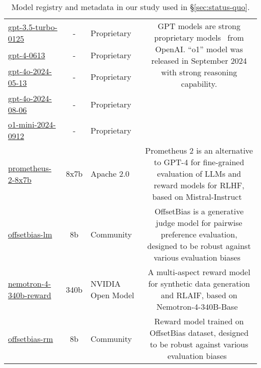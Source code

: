 \begin{table*}[ht!]
\begin{tabular}{@{}lclc@{}}
        \midrule
    \href{https://platform.openai.com/docs/models}{gpt-3.5-turbo-0125}       & -             & Proprietary & \multirow{3}{7cm}{GPT models are strong proprietary models~\citep{achiam2023gpt} from OpenAI. ``o1'' model was released in September 2024 with strong reasoning capability. }                       \\
             \href{https://platform.openai.com/docs/models}{gpt-4-0613}                   & -             & Proprietary & \\

    \href{https://platform.openai.com/docs/models}{gpt-4o-2024-05-13}                   & -             & Proprietary & \\
     \href{https://platform.openai.com/docs/models}{gpt-4o-2024-08-06}                   & -             & Proprietary & \\
  \href{https://platform.openai.com/docs/models}{o1-mini-2024-0912}                   & -             & Proprietary & \\
 \midrule
    \href{https://huggingface.co/prometheus-eval/prometheus-8x7b-v2.0}{prometheus-2-8x7b}       & 8x7b  & Apache 2.0 & \parbox{7cm}{Prometheus 2 is an alternative to GPT-4 for fine-grained evaluation of LLMs and reward models for RLHF, based on Mistral-Instruct~\citep{kim2024prometheus2}}                                        \\ 
    \href{https://huggingface.co/NCSOFT/Llama-3-OffsetBias-8B}{offsetbias-lm}       & 8b  &  Community & \parbox{7cm}{OffsetBias is a generative judge model for pairwise preference evaluation, designed to be robust against various evaluation biases~\citep{park2024offsetbias}}                                        \\ \midrule
    
  \href{https://huggingface.co/nvidia/Nemotron-4-340B-Reward}{nemotron-4-340b-reward}       & 340b  & NVIDIA Open Model & \parbox{7cm}{A multi-aspect reward model for synthetic data generation and RLAIF, based on Nemotron-4-340B-Base~\citep{wang2024helpsteer2}}   \\                                
    \href{https://huggingface.co/NCSOFT/Llama-3-OffsetBias-RM-8B}{offsetbias-rm}       & 8b  &  Community & \parbox{7cm}{Reward model trained on OffsetBias dataset, designed to be robust against various evaluation biases~\citep{park2024offsetbias}}                                        \\ 

     \bottomrule
    \end{tabular}
    \caption{Model registry and metadata in our study used in \S\ref{sec:status-quo}.}
    \label{tab:appx_model_registry}
    \end{table*}